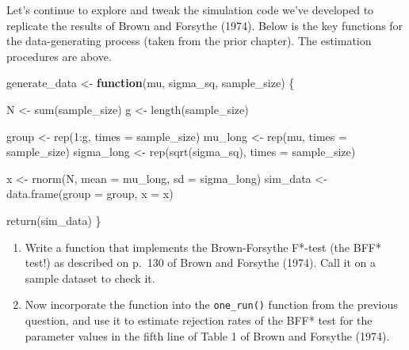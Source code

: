 \documentclass[
]{book}
\newenvironment{Shaded}{\begin{snugshade}}{\end{snugshade}}
\newcommand{\AttributeTok}[1]{\textcolor[rgb]{0.77,0.63,0.00}{#1}}
\newcommand{\ControlFlowTok}[1]{\textcolor[rgb]{0.13,0.29,0.53}{\textbf{#1}}}
\newcommand{\DecValTok}[1]{\textcolor[rgb]{0.00,0.00,0.81}{#1}}
\newcommand{\FunctionTok}[1]{\textcolor[rgb]{0.00,0.00,0.00}{#1}}
\newcommand{\NormalTok}[1]{#1}
\newcommand{\OtherTok}[1]{\textcolor[rgb]{0.56,0.35,0.01}{#1}}
\newcommand{\SpecialCharTok}[1]{\textcolor[rgb]{0.00,0.00,0.00}{#1}}
\begin{document}
Let's continue to explore and tweak the simulation code we've developed to replicate the results of Brown and Forsythe (1974).
Below is the key functions for the data-generating process (taken from the prior chapter).
The estimation procedures are above.

\begin{Shaded}
\begin{Highlighting}[]
\NormalTok{generate\_data }\OtherTok{\textless{}{-}} \ControlFlowTok{function}\NormalTok{(mu, sigma\_sq, sample\_size) \{}

\NormalTok{  N }\OtherTok{\textless{}{-}} \FunctionTok{sum}\NormalTok{(sample\_size) }
\NormalTok{  g }\OtherTok{\textless{}{-}} \FunctionTok{length}\NormalTok{(sample\_size) }
  
\NormalTok{  group }\OtherTok{\textless{}{-}} \FunctionTok{rep}\NormalTok{(}\DecValTok{1}\SpecialCharTok{:}\NormalTok{g, }\AttributeTok{times =}\NormalTok{ sample\_size) }
\NormalTok{  mu\_long }\OtherTok{\textless{}{-}} \FunctionTok{rep}\NormalTok{(mu, }\AttributeTok{times =}\NormalTok{ sample\_size)}
\NormalTok{  sigma\_long }\OtherTok{\textless{}{-}} \FunctionTok{rep}\NormalTok{(}\FunctionTok{sqrt}\NormalTok{(sigma\_sq), }\AttributeTok{times =}\NormalTok{ sample\_size) }
  
\NormalTok{  x }\OtherTok{\textless{}{-}} \FunctionTok{rnorm}\NormalTok{(N, }\AttributeTok{mean =}\NormalTok{ mu\_long, }\AttributeTok{sd =}\NormalTok{ sigma\_long)}
\NormalTok{  sim\_data }\OtherTok{\textless{}{-}} \FunctionTok{data.frame}\NormalTok{(}\AttributeTok{group =}\NormalTok{ group, }\AttributeTok{x =}\NormalTok{ x)}
    
  \FunctionTok{return}\NormalTok{(sim\_data)}
\NormalTok{\}}
\end{Highlighting}
\end{Shaded}

\begin{enumerate}
\def\labelenumi{\arabic{enumi}.}
\item
  Write a function that implements the Brown-Forsythe F*-test (the BFF* test!) as described on p.~130 of Brown and Forsythe (1974).
  Call it on a sample dataset to check it.
\item
  Now incorporate the function into the \texttt{one\_run()} function from the previous question, and use it to estimate rejection rates of the BFF* test for the parameter values in the fifth line of Table 1 of Brown and Forsythe (1974).
\end{enumerate}
\end{document}
